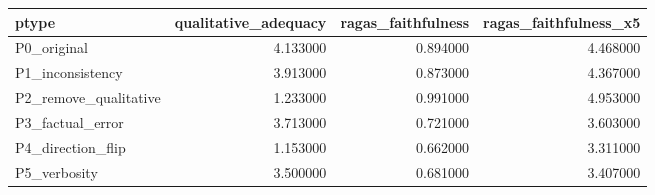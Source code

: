 \begin{tabular}{lrrr}
\toprule
ptype & qualitative_adequacy & ragas_faithfulness & ragas_faithfulness_x5 \\
\midrule
P0_original & 4.133000 & 0.894000 & 4.468000 \\
P1_inconsistency & 3.913000 & 0.873000 & 4.367000 \\
P2_remove_qualitative & 1.233000 & 0.991000 & 4.953000 \\
P3_factual_error & 3.713000 & 0.721000 & 3.603000 \\
P4_direction_flip & 1.153000 & 0.662000 & 3.311000 \\
P5_verbosity & 3.500000 & 0.681000 & 3.407000 \\
\bottomrule
\end{tabular}
